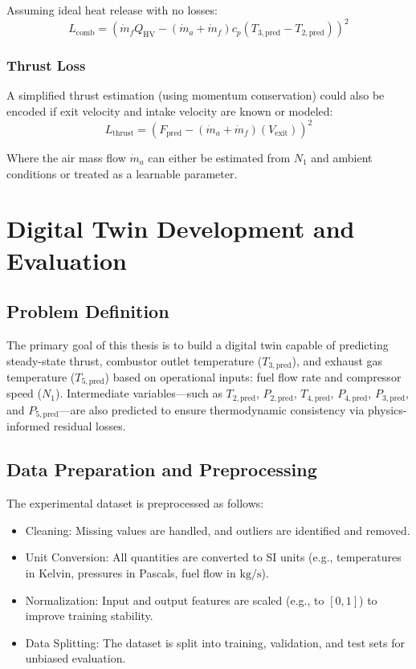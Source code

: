 \documentclass[
  12pt,
  oneside,
  a4paper,
  english,
  brazil]{abntex2}
\begin{document}
Assuming ideal heat release with no losses: \[
L_{\text{comb}} = \left( \dot{m}_f Q_{\text{HV}} - (\dot{m}_a + \dot{m}_f) c_p (T_{3,\text{pred}} - T_{2,\text{pred}}) \right)^2
\]

\subsubsection{Thrust Loss}\label{thrust-loss}

A simplified thrust estimation (using momentum conservation) could also
be encoded if exit velocity and intake velocity are known or modeled: \[
L_{\text{thrust}} = \left( F_{\text{pred}} - (\dot{m}_a + \dot{m}_f) (V_{\text{exit}}) \right)^2
\]

Where the air mass flow \(\dot{m}_a\) can either be estimated from
\(N_1\) and ambient conditions or treated as a learnable parameter.

\section{Digital Twin Development and
Evaluation}\label{digital-twin-development-and-evaluation}

\subsection{Problem Definition}\label{problem-definition}

The primary goal of this thesis is to build a digital twin capable of
predicting steady-state thrust, combustor outlet temperature
(\(T_{3,\text{pred}}\)), and exhaust gas temperature
(\(T_{5,\text{pred}}\)) based on operational inputs: fuel flow rate and
compressor speed (\(N_1\)). Intermediate variables---such as
\(T_{2,\text{pred}}\), \(P_{2,\text{pred}}\), \(T_{4,\text{pred}}\),
\(P_{4,\text{pred}}\), \(P_{3,\text{pred}}\), and
\(P_{5,\text{pred}}\)---are also predicted to ensure thermodynamic
consistency via physics-informed residual losses.

\subsection{Data Preparation and
Preprocessing}\label{data-preparation-and-preprocessing}

The experimental dataset is preprocessed as follows:

\begin{itemize}
    \item Cleaning: Missing values are handled, and outliers are identified and removed.
    \item Unit Conversion: All quantities are converted to SI units (e.g., temperatures in Kelvin, pressures in Pascals, fuel flow in $\mathrm{kg/s}$).
    \item Normalization: Input and output features are scaled (e.g., to $[0, 1]$) to improve training stability.
    \item Data Splitting: The dataset is split into training, validation, and test sets for unbiased evaluation.
\end{itemize}
\end{document}
